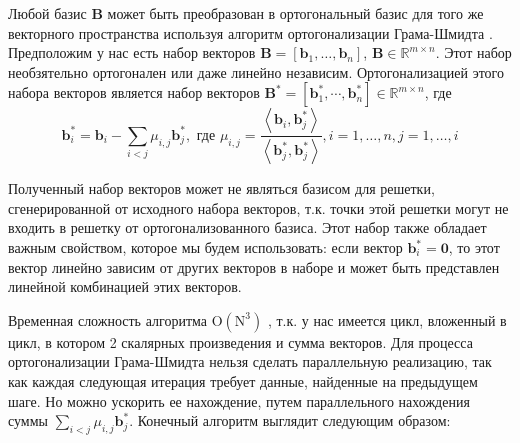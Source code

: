 Любой базис $ \mathbf{B} $ может быть преобразован в ортогональный базис для того же векторного пространства используя алгоритм ортогонализации Грама-Шмидта \cite{lec1}.
Предположим у нас есть набор векторов $ \mathbf{B} = [\mathbf{b}_1, \ldots, \mathbf{b}_n] $, $ \mathbf{B} \in \mathbb{R}^{m \times n} $. Этот набор необзятельно ортогонален или даже линейно независим. Ортогонализацией этого набора векторов является набор векторов $ \mathbf{B}^* = [\mathbf{b}^*_1, \cdots, \mathbf{b}^*_n] \in \mathbb{R}^{m \times n} $, где $$ \mathbf{b}^*_i = \mathbf{b}_i - \sum_{i < j} \mu_{i, j} \mathbf{b}^*_j, \text{ где } \mu_{i, j} = \frac{\left\langle \mathbf{b}_i, \mathbf{b}^*_j \right\rangle}{\left\langle \mathbf{b}^*_j, \mathbf{b}^*_j \right\rangle}, i = 1, \ldots, n, j = 1, \ldots, i $$

Полученный набор векторов может не являться базисом для решетки, сгенерированной от исходного набора векторов, т.к. точки этой решетки могут не входить в решетку от ортогонализованного базиса. Этот набор также обладает важным свойством, которое мы будем использовать: если вектор $ \mathbf{b}^*_i = \mathbf{0} $, то этот вектор линейно зависим от других векторов в наборе и может быть представлен линейной комбинацией этих векторов.

Временная сложность алгоритма $ \mathrm{O(N^3)} $ \cite{Gram}, т.к. у нас имеется цикл, вложенный в цикл, в котором 2 скалярных произведения и сумма векторов. Для процесса ортогонализации Грама-Шмидта нельзя сделать параллельную реализацию, так как каждая следующая итерация требует данные, найденные на предыдущем шаге. Но можно ускорить ее нахождение, путем параллельного нахождения суммы $ \sum_{i < j} \mu_{i, j} \mathbf{b}^*_j $. Конечный алгоритм выглядит следующим образом:

\begin{algorithmic}

	
	\EndFor
	
\EndFor
\end{algorithmic}

